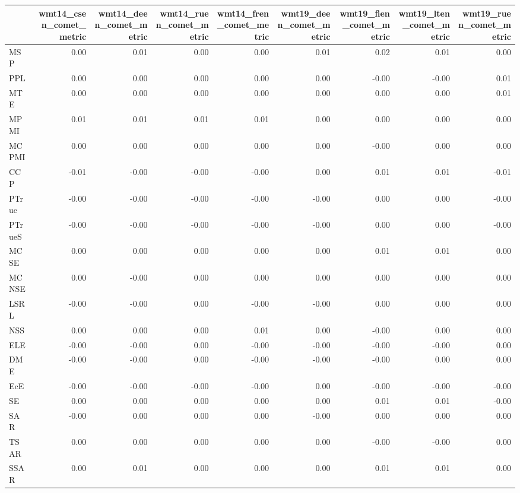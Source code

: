\begin{tabular}{lrrrrrrrr}
\toprule
 & wmt14\_csen\_comet\_metric & wmt14\_deen\_comet\_metric & wmt14\_ruen\_comet\_metric & wmt14\_fren\_comet\_metric & wmt19\_deen\_comet\_metric & wmt19\_fien\_comet\_metric & wmt19\_lten\_comet\_metric & wmt19\_ruen\_comet\_metric \\
\midrule
MSP & 0.00 & 0.01 & 0.00 & 0.00 & 0.01 & 0.02 & 0.01 & 0.00 \\
PPL & 0.00 & 0.00 & 0.00 & 0.00 & 0.00 & -0.00 & -0.00 & 0.01 \\
MTE & 0.00 & 0.00 & 0.00 & 0.00 & 0.00 & 0.00 & 0.00 & 0.01 \\
MPMI & 0.01 & 0.01 & 0.01 & 0.01 & 0.00 & 0.00 & 0.00 & 0.00 \\
MCPMI & 0.00 & 0.00 & 0.00 & 0.00 & 0.00 & -0.00 & 0.00 & 0.00 \\
CCP & -0.01 & -0.00 & -0.00 & -0.00 & 0.00 & 0.01 & 0.01 & -0.01 \\
PTrue & -0.00 & -0.00 & -0.00 & -0.00 & -0.00 & 0.00 & 0.00 & -0.00 \\
PTrueS & -0.00 & -0.00 & -0.00 & -0.00 & -0.00 & 0.00 & 0.00 & -0.00 \\
MCSE & 0.00 & 0.00 & 0.00 & 0.00 & 0.00 & 0.01 & 0.01 & 0.00 \\
MCNSE & 0.00 & -0.00 & 0.00 & 0.00 & 0.00 & 0.00 & 0.00 & 0.00 \\
LSRL & -0.00 & -0.00 & 0.00 & -0.00 & -0.00 & 0.00 & 0.00 & 0.00 \\
NSS & 0.00 & 0.00 & 0.00 & 0.01 & 0.00 & -0.00 & 0.00 & 0.00 \\
ELE & -0.00 & -0.00 & 0.00 & -0.00 & -0.00 & -0.00 & -0.00 & 0.00 \\
DME & -0.00 & -0.00 & 0.00 & -0.00 & -0.00 & -0.00 & 0.00 & 0.00 \\
EcE & -0.00 & -0.00 & -0.00 & -0.00 & 0.00 & -0.00 & -0.00 & -0.00 \\
SE & 0.00 & 0.00 & 0.00 & 0.00 & 0.00 & 0.01 & 0.01 & -0.00 \\
SAR & -0.00 & 0.00 & 0.00 & 0.00 & -0.00 & 0.00 & 0.00 & 0.00 \\
TSAR & 0.00 & 0.00 & 0.00 & 0.00 & 0.00 & -0.00 & -0.00 & 0.00 \\
SSAR & 0.00 & 0.01 & 0.00 & 0.00 & 0.00 & 0.01 & 0.01 & 0.00 \\
\bottomrule
\end{tabular}
